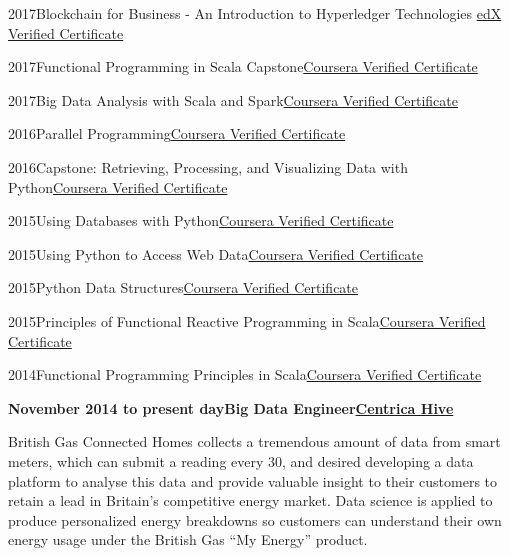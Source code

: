 \documentclass[a4paper,12pt]{article}
\newcommand{\head}[1]{\needspace{6em}\begin{center}{\large{\textbf{\sc{#1}}}}\nopagebreak\end{center}}
\newcommand{\clientwork}[3]{\textbf{#1\hfill#3\hfill#2}\nopagebreak}
\newcommand{\tab}{\hspace{2em}}
\newcommand{\education}[3]{#1\tab#2\hfill#3}
\begin{document}
\head{Certifications}

\education{2017}{Blockchain for Business - An Introduction to Hyperledger Technologies
}{\href{https://courses.edx.org/certificates/de3424d0c11842f48fb2c79ddf1073c8}{edX Verified Certificate}}

\education{2017}{Functional Programming in Scala Capstone}{\href{https://www.coursera.org/account/accomplishments/verify/4F5MVWUN8MWZ}{Coursera Verified Certificate}}

\education{2017}{Big Data Analysis with Scala and Spark}{\href{https://www.coursera.org/account/accomplishments/verify/BT95Z35S6LVX}{Coursera Verified Certificate}}

\education{2016}{Parallel Programming}{\href{https://www.coursera.org/account/accomplishments/verify/CJ4JSLUQK73D}{Coursera Verified Certificate}}

\education{2016}{Capstone: Retrieving, Processing, and Visualizing Data with Python}{\href{https://www.coursera.org/account/accomplishments/verify/8MKC3G5RN9S3}{Coursera Verified Certificate}}

\education{2015}{Using Databases with Python}{\href{https://www.coursera.org/account/accomplishments/verify/JNESYEJ5FURJ}{Coursera Verified Certificate}}

\education{2015}{Using Python to Access Web Data}{\href{https://www.coursera.org/account/accomplishments/verify/BVY6EDX4Z2PM}{Coursera Verified Certificate}}

\education{2015}{Python Data Structures}{\href{https://www.coursera.org/account/accomplishments/verify/VHVY2836QWWS}{Coursera Verified Certificate}}

\education{2015}{Principles of Functional Reactive Programming in Scala}{\href{https://www.coursera.org/account/accomplishments/records/8jPph3vAjsWdaQeW}{Coursera Verified Certificate}}

\education{2014}{Functional Programming Principles in Scala}{\href{https://www.coursera.org/maestro/api/certificate/get_certificate?verify-code=87DZAXY7SA}{Coursera Verified Certificate}}

\head{Career History}

\clientwork{November 2014 to present day}{\href{https://www.hivehome.com}{Centrica Hive}}{Big Data Engineer}

British Gas Connected Homes collects a tremendous amount of data from smart meters, which can submit a reading every 30, and desired developing a data platform to analyse this data and provide valuable insight to their customers to retain a lead in Britain’s competitive energy market. Data science is applied to produce personalized energy breakdowns so customers can understand their own energy usage under the British Gas “My Energy” product.\\
\end{document}
